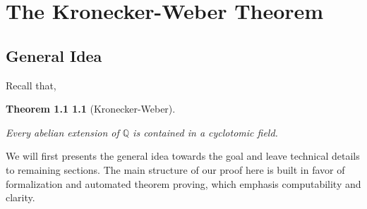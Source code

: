 \chapter{The Kronecker-Weber Theorem}
\label{cp:kw}
\section{General Idea}
Recall that,
\newtheorem*{restatement}{Theorem 1.1}
\begin{restatement}[Kronecker-Weber]
    ~\begin{center}
    Every abelian extension of $\mathbb{Q}$ is contained in a cyclotomic field.
\end{center}
\end{restatement}
\noindent
We will first presents the general idea towards the goal and leave technical details to remaining sections. The main structure of our proof here is built in favor of formalization and automated theorem proving, which emphasis computability and clarity.
